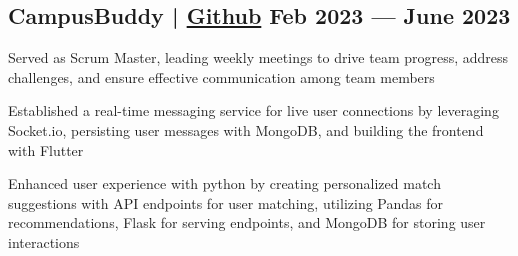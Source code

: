 
\subsection{{CampusBuddy | \href{https://github.com/pegliang/CampusBuddy}{Github} \hfill Feb 2023 --- June 2023}}
\begin{zitemize}
\item Served as Scrum Master, leading weekly meetings to drive team progress, address challenges, and ensure effective communication among team members
\item Established a real-time messaging service for live user connections by leveraging Socket.io, persisting user messages with MongoDB, and building the frontend with Flutter
\item Enhanced user experience with python by creating personalized match suggestions with API endpoints for user matching, utilizing Pandas for recommendations, Flask for serving endpoints, and MongoDB for storing user interactions
\end{zitemize}


